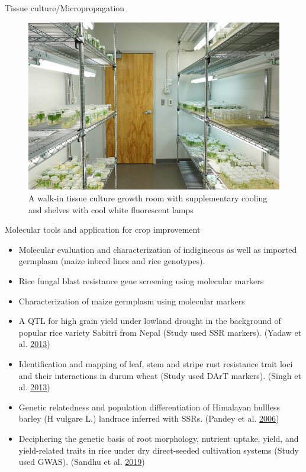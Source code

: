\documentclass[
  ignorenonframetext,
  aspectratio=169]{beamer}
\providecommand{\tightlist}{%
  \setlength{\itemsep}{0pt}\setlength{\parskip}{0pt}}
\begin{document}
\begin{frame}{Tissue culture/Micropropagation}
\protect\hypertarget{tissue-culturemicropropagation}{}
\begin{figure}
\includegraphics[width=0.6\linewidth]{../images/tissue_culture_chamber} \caption{A walk-in tissue culture growth room with supplementary cooling and shelves with cool white fluorescent lamps}\label{fig:tissue-culture-illustration}
\end{figure}
\end{frame}

\begin{frame}{Molecular tools and application for crop improvement}
\protect\hypertarget{molecular-tools-and-application-for-crop-improvement}{}
\begin{itemize}
\tightlist
\item
  Molecular evaluation and characterization of indigineous as well as
  imported germplasm (maize inbred lines and rice genotypes).
\item
  Rice fungal blast resistance gene screening using molecular markers
\item
  Characterization of maize germplasm using molecular markers
\item
  A QTL for high grain yield under lowland drought in the background of
  popular rice variety Sabitri from Nepal (Study used SSR markers).
  (Yadaw et al. \protect\hyperlink{ref-yadaw2013qtl}{2013})
\item
  Identification and mapping of leaf, stem and stripe rust resistance
  trait loci and their interactions in durum wheat (Study used DArT
  markers). (Singh et al.
  \protect\hyperlink{ref-singh2013identification}{2013})
\item
  Genetic relatedness and population differentiation of Himalayan
  hullless barley (H vulgare L.) landrace inferred with SSRs. (Pandey et
  al. \protect\hyperlink{ref-pandey2006genetic}{2006})
\item
  Deciphering the genetic basis of root morphology, nutrient uptake,
  yield, and yield-related traits in rice under dry direct-seeded
  cultivation systems (Study used GWAS). (Sandhu et al.
  \protect\hyperlink{ref-sandhu2019deciphering}{2019})
\end{itemize}
\end{frame}
\end{document}

